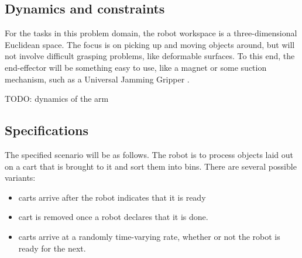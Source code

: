 \documentclass{amsart}
\theoremstyle{definition}
\begin{document}
%
%

\subsection{Dynamics and constraints}
For the tasks in this problem domain, the robot workspace is a three-dimensional
Euclidean space. The focus is on picking up and moving objects around, but will not 
involve difficult grasping problems, like deformable surfaces. To this end, the end-effector
will be something easy to use, like a magnet or some suction mechanism, such as a 
Universal Jamming Gripper \cite{AmendBRJL12}.

TODO: dynamics of the arm


\subsection{Specifications}
The specified scenario will be as follows. The robot is to process objects laid out on a cart that 
is brought to it and sort them into bins. There are several possible variants:
\begin{itemize}
\item carts arrive after the robot indicates that it is ready
\item cart is removed once a robot declares that it is done.
\item carts arrive at a randomly time-varying rate, whether or not the robot is ready for the next.
\end{itemize}
\end{document}
